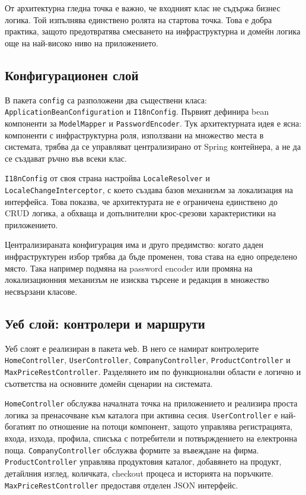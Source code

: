 От архитектурна гледна точка е важно, че входният клас не съдържа бизнес логика. Той изпълнява единствено ролята на стартова точка. Това е добра практика, защото предотвратява смесването на инфраструктурна и домейн логика още на най-високо ниво на приложението.

\subsection{Конфигурационен слой}

В пакета \texttt{config} са разположени два съществени класа: \texttt{ApplicationBeanConfiguration} и \texttt{I18nConfig}. Първият дефинира bean компоненти за \texttt{ModelMapper} и \texttt{PasswordEncoder}. Тук архитектурната идея е ясна: компоненти с инфраструктурна роля, използвани на множество места в системата, трябва да се управляват централизирано от Spring контейнера, а не да се създават ръчно във всеки клас.

\texttt{I18nConfig} от своя страна настройва \texttt{LocaleResolver} и \texttt{LocaleChangeInterceptor}, с което създава базов механизъм за локализация на интерфейса. Това показва, че архитектурата не е ограничена единствено до CRUD логика, а обхваща и допълнителни крос-срезови характеристики на приложението.

Централизираната конфигурация има и друго предимство: когато даден инфраструктурен избор трябва да бъде променен, това става на едно определено място. Така например подмяна на password encoder или промяна на локализационния механизъм не изисква търсене и редакция в множество несвързани класове.

\subsection{Уеб слой: контролери и маршрути}

Уеб слоят е реализиран в пакета \texttt{web}. В него се намират контролерите \texttt{HomeController}, \texttt{UserController}, \texttt{CompanyController}, \texttt{ProductController} и \texttt{MaxPriceRestController}. Разделянето им по функционални области е логично и съответства на основните домейн сценарии на системата.

\texttt{HomeController} обслужва началната точка на приложението и реализира проста логика за пренасочване към каталога при активна сесия. \texttt{UserController} е най-богатият по отношение на потоци компонент, защото управлява регистрацията, входа, изхода, профила, списъка с потребители и потвърждението на електронна поща. \texttt{CompanyController} обслужва формите за въвеждане на фирма. \texttt{ProductController} управлява продуктовия каталог, добавянето на продукт, детайлния изглед, количката, checkout процеса и историята на поръчките. \texttt{MaxPriceRestController} предоставя отделен JSON интерфейс.

